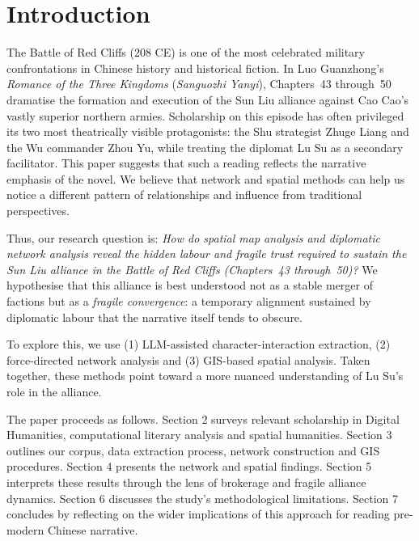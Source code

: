 \documentclass[12pt, a4paper]{article}
\newcommand{\booktitle}[1]{\textit{#1}}
\begin{document}
\newpage
\tableofcontents
\newpage

\section{Introduction}
\label{sec:introduction}

The Battle of Red Cliffs (208 CE) is one of the most celebrated military confrontations in Chinese history and historical fiction. 
In Luo Guanzhong's \booktitle{Romance of the Three Kingdoms}
(\booktitle{Sanguozhi Yanyi}), Chapters~43 through~50 dramatise the formation and
execution of the Sun Liu alliance against Cao Cao's vastly superior northern
armies.
Scholarship on this episode has often privileged its two most theatrically visible protagonists: the Shu strategist Zhuge Liang and the Wu commander Zhou Yu, while treating the diplomat Lu Su as a secondary facilitator. This paper suggests that such a reading reflects the narrative emphasis of the novel. We believe that network and spatial methods can help us notice a different pattern of relationships and influence from traditional perspectives.

Thus, our research question is:
\emph{How do spatial map analysis and diplomatic network analysis reveal the
hidden labour and fragile trust required to sustain the Sun Liu alliance
in the Battle of Red Cliffs (Chapters~43 through~50)?}
We hypothesise that this alliance is best understood not as a stable merger of
factions but as a \emph{fragile convergence}: a temporary alignment sustained
by diplomatic labour that the narrative itself tends to obscure.

To explore this, we use (1) LLM-assisted character-interaction extraction, (2) force-directed network analysis and (3) GIS-based spatial analysis. Taken together, these methods point toward a more nuanced understanding of Lu Su’s role in the alliance.

The paper proceeds as follows. Section 2 surveys relevant scholarship in Digital Humanities, computational literary analysis and spatial humanities. Section 3 outlines our corpus, data extraction process, network construction and GIS procedures. Section 4 presents the network and spatial findings. Section 5 interprets these results through the lens of brokerage and fragile alliance dynamics. Section 6 discusses the study’s methodological limitations. Section 7 concludes by reflecting on the wider implications of this approach for reading pre-modern Chinese narrative.
\end{document}
